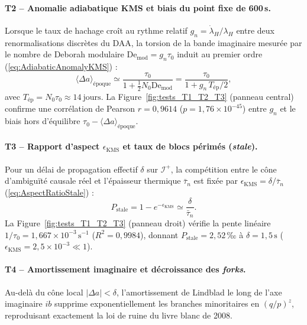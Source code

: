 \documentclass[10pt,twocolumn,a4paper]{article}
\theoremstyle{plain}
\theoremstyle{definition}
\theoremstyle{remark}
\newcommand{\scri}{\mathcal{I}}
\begin{document}
\paragraph{T2 -- Anomalie adiabatique KMS et biais du point fixe de 600\,s.}
Lorsque le taux de hachage croît au rythme relatif $g_n = \dot\lambda_H/\lambda_H$ entre deux renormalisations discrètes du DAA, la torsion de la bande imaginaire mesurée par le nombre de Deborah modulaire $\mathrm{De}_{\text{mod}} = g_n \tau_0$ induit au premier ordre (\ref{eq:AdiabaticAnomalyKMS}) :
\begin{equation}
  \langle \Delta a \rangle_{\text{époque}} \simeq \frac{\tau_0}{1 + \frac{1}{2} N_0 \mathrm{De}_{\text{mod}}} = \frac{\tau_0}{1 + g_n\,T_{\text{ép}}/2},
  \label{eq:test-biais}
\end{equation}
avec $T_{\text{ép}} = N_0 \tau_0 \approx 14\ \text{jours}$. La Figure~\ref{fig:tests_T1_T2_T3} (panneau central) confirme une corrélation de Pearson $r = 0{,}9614$ ($p = 1{,}76 \times 10^{-45}$) entre $g_n$ et le biais hors d'équilibre $\tau_0 - \langle\Delta a\rangle_{\text{époque}}$.

\paragraph{T3 -- Rapport d'aspect $\epsilon_{\text{KMS}}$ et taux de blocs périmés (\textit{stale}).}
Pour un délai de propagation effectif $\delta$ sur $\scri^+$, la compétition entre le cône d'ambiguïté causale réel et l'épaisseur thermique $\bar{\tau}_n$ est fixée par $\epsilon_{\text{KMS}} = \delta/\bar{\tau}_n$ (\ref{eq:AspectRatioStale}) :
\begin{equation}
  P_{\text{stale}} = 1 - e^{-\epsilon_{\text{KMS}}} \simeq \frac{\delta}{\bar\tau_n}.
  \label{eq:test-stale}
\end{equation}
La Figure~\ref{fig:tests_T1_T2_T3} (panneau droit) vérifie la pente linéaire $1/\tau_0 = 1{,}667 \times 10^{-3}\,\text{s}^{-1}$ ($R^2 = 0{,}9984$), donnant $P_{\text{stale}} = 2{,}52\,\text{‰}$ à $\delta = 1{,}5\,\text{s}$ ($\epsilon_{\text{KMS}} = 2{,}5 \times 10^{-3} \ll 1$).

\paragraph{T4 -- Amortissement imaginaire et décroissance des \textit{forks}.}
Au-delà du cône local $|\Delta a| < \delta$, l'amortissement de Lindblad le long de l'axe imaginaire $ib$ supprime exponentiellement les branches minoritaires en $(q/p)^z$, reproduisant exactement la loi de ruine du livre blanc de 2008.
\end{document}
